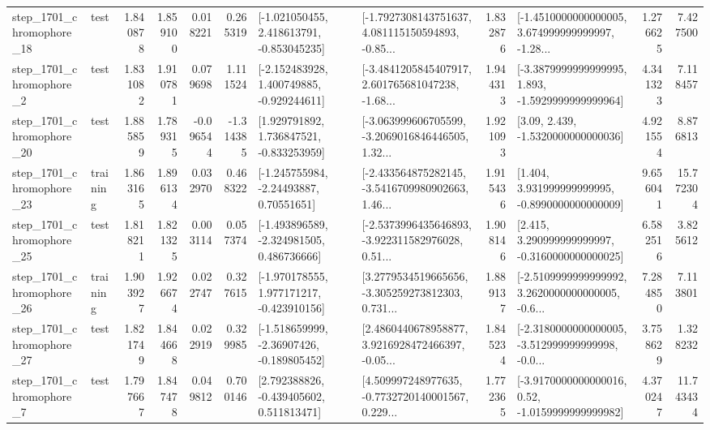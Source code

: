 \begin{tabular}{llrrrrllrlrr}
 step\_1701\_chromophore\_18 &      test &      1.840878 &    1.859100 &      0.018221 &  0.265319 &   [-1.021050455, 2.418613791, -0.853045235] &  [-1.7927308143751637, 4.081115150594893, -0.85... &       1.832876 &  [-1.4510000000000005, 3.674999999999997, -1.28... &            1.276625 &          7.427500 \\
  step\_1701\_chromophore\_2 &      test &      1.831082 &    1.910781 &      0.079698 &  1.111524 &   [-2.152483928, 1.400749885, -0.929244611] &  [-3.4841205845407917, 2.601765681047238, -1.68... &       1.944313 &  [-3.3879999999999995, 1.893, -1.5929999999999964] &            4.341323 &          7.118457 \\
 step\_1701\_chromophore\_20 &      test &      1.885859 &    1.789315 &     -0.096544 & -1.314385 &    [1.929791892, 1.736847521, -0.833253959] &  [-3.063999606705599, -3.2069016846446505, 1.32... &       1.921093 &                 [3.09, 2.439, -1.5320000000000036] &            4.921554 &          8.876813 \\
 step\_1701\_chromophore\_23 &  training &      1.863165 &    1.896134 &      0.032970 &  0.468322 &     [-1.245755984, -2.24493887, 0.70551651] &  [-2.433564875282145, -3.5416709980902663, 1.46... &       1.915436 &    [1.404, 3.931999999999995, -0.8990000000000009] &            9.656041 &         15.772304 \\
 step\_1701\_chromophore\_25 &      test &      1.818211 &    1.821325 &      0.003114 &  0.057374 &   [-1.493896589, -2.324981505, 0.486736666] &  [-2.5373996435646893, -3.922311582976028, 0.51... &       1.908146 &    [2.415, 3.290999999999997, -0.3160000000000025] &            6.582516 &          3.825612 \\
 step\_1701\_chromophore\_26 &  training &      1.903927 &    1.926674 &      0.022747 &  0.327615 &   [-1.970178555, 1.977171217, -0.423910156] &  [3.2779534519665656, -3.305259273812303, 0.731... &       1.889137 &  [-2.5109999999999992, 3.2620000000000005, -0.6... &            7.284850 &          7.113801 \\
 step\_1701\_chromophore\_27 &      test &      1.821749 &    1.844668 &      0.022919 &  0.329985 &   [-1.518659999, -2.36907426, -0.189805452] &  [2.4860440678958877, 3.9216928472466397, -0.05... &       1.845234 &  [-2.3180000000000005, -3.512999999999998, -0.0... &            3.758629 &          1.328232 \\
  step\_1701\_chromophore\_7 &      test &      1.797667 &    1.847478 &      0.049812 &  0.700146 &    [2.792388826, -0.439405602, 0.511813471] &  [4.509997248977635, -0.7732720140001567, 0.229... &       1.772365 &   [-3.9170000000000016, 0.52, -1.0159999999999982] &            4.370247 &         11.743434 \\

\end{tabular}
